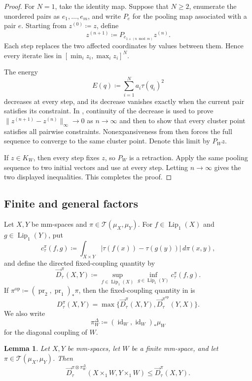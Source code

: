 \documentclass[10pt,a4paper]{amsart}
\newtheorem{lemma}[theorem]{Lemma}
\newcommand{\T}{\mathcal T}
\DeclareMathOperator{\pr}{pr}
\begin{document}
\begin{proof}
For $N=1$, take the identity map. Suppose that $N\geq2$, enumerate the unordered pairs as $e_1,\ldots,e_m$, and write $P_e$ for the pooling map associated with a pair $e$. Starting from $z^{(0)}\coloneqq z$, define
\[
z^{(n+1)}\coloneqq P_{e_{1+(n\bmod m)}}z^{(n)}.
\]
Each step replaces the two affected coordinates by values between them. Hence every iterate lies in $[\min_i z_i,\max_i z_i]^N$.

The energy
\[
E(q)\coloneqq\sum_{i=1}^Na_i\tau(q_i)^2
\]
decreases at every step, and its decrease vanishes exactly when the current pair satisfies its constraint. In , continuity of the decrease is used to prove $\|z^{(n+1)}-z^{(n)}\|_\infty\to0$ as $n\to\infty$ and then to show that every cluster point satisfies all pairwise constraints. Nonexpansiveness from  then forces the full sequence to converge to the same cluster point. Denote this limit by $P_Wz$.

If $z\in K_W$, then every step fixes $z$, so $P_W$ is a retraction. Apply the same pooling sequence to two initial vectors and use  at every step. Letting $n\to\infty$ gives the two displayed inequalities. This completes the proof.
\end{proof}

\subsection{Finite and general factors}
\label{subsec:factor-contraction}

Let $X,Y$ be mm-spaces and $\pi\in\T(\mu_X,\mu_Y)$. For $f\in\operatorname{Lip}_1(X)$ and $g\in\operatorname{Lip}_1(Y)$, put
\[
c_\tau^\pi(f,g)\coloneqq\int_{X\times Y}|\tau(f(x))-\tau(g(y))|\,d\pi(x,y),
\]
and define the directed fixed-coupling quantity by
\[
\overrightarrow D_\tau^\pi(X,Y)\coloneqq\sup_{f\in\operatorname{Lip}_1(X)}\inf_{g\in\operatorname{Lip}_1(Y)}c_\tau^\pi(f,g).
\]
If $\pi^{\mathrm{op}}\coloneqq(\pr_2,\pr_1)_*\pi$, then the fixed-coupling quantity in  is
\[
D_\tau^\pi(X,Y)=\max\{\overrightarrow D_\tau^\pi(X,Y),\overrightarrow D_\tau^{\pi^{\mathrm{op}}}(Y,X)\}.
\]
We also write
\[
\pi_W^\Delta\coloneqq(\operatorname{id}_W,\operatorname{id}_W)_*\mu_W
\]
for the diagonal coupling of $W$.

\begin{lemma}
\label{lem:finite-factor-contraction}
Let $X,Y$ be mm-spaces, let $W$ be a finite mm-space, and let $\pi\in\T(\mu_X,\mu_Y)$. Then
\[
\overrightarrow D_\tau^{\pi\otimes\pi_W^\Delta}(X\times_1W,Y\times_1W)\leq\overrightarrow D_\tau^\pi(X,Y).
\]
\end{lemma}
\end{document}

